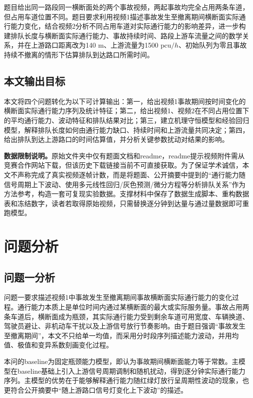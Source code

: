 \documentclass[UTF8,a4paper,12pt]{ctexart}
\newcommand{\pcu}{\mathrm{pcu}}
\begin{document}
题目给出同一路段同一横断面处的两个事故视频，两起事故均完全占用两条车道，但占用车道位置不同。题目要求利用视频1描述事故发生至撤离期间横断面实际通行能力变化，结合视频2分析不同占用车道对实际通行能力的影响差异，进一步构建排队长度与横断面实际通行能力、事故持续时间、路段上游车流量之间的数学关系，并在上游路口距离改为140 m、上游流量为1500 $\pcu/h$、初始队列为零且事故持续不撤离的情形下估算排队到达路口所需时间。

\subsection{本文输出目标}
本文将四个问题转化为以下可计算输出：第一，给出视频1事故期间按时间变化的横断面实际通行能力序列及统计特征；第二，给出视频1、视频2在不同占用位置下的平均通行能力、波动特征和排队结果对比；第三，建立机理守恒模型和经验回归模型，解释排队长度如何由通行能力缺口、持续时间和上游流量共同决定；第四，给出排队到达上游路口的时间估算值，并分析关键参数扰动对结果的影响。

\textbf{数据限制说明。}原始文件夹中仅有题面文档和readme，readme提示视频附件需从竞赛合作网站下载，但该历史下载链接当前不可直接获取。为了保证学术诚信，本文不声称完成了真实视频逐帧计数，而是将题面、公开摘要中提到的“通行能力随信号周期上下波动、使用多元线性回归/灰色预测/微分方程等分析排队关系”作为方法参考，构造一套可复现实验数据。支撑材料中保存了数据生成脚本、重构数据表和冻结数字，读者若取得原始视频，只需替换逐分钟到达量与通过量数据即可重跑模型。

\section{问题分析}
\subsection{问题一分析}
问题一要求描述视频1中事故发生至撤离期间事故横断面实际通行能力的变化过程。通行能力本质上是单位时间内通过某横断面的最大或实际服务量。事故占用两条车道后，横断面成为瓶颈，其实际通行能力受到剩余车道可用宽度、车辆换道、驾驶员避让、非机动车干扰以及上游信号放行节奏影响。由于题目强调“事故发生至撤离期间”，本文不只给单一均值，而采用分时段序列描述能力波动，并用均值、极值和变异系数刻画变化过程。

本问的baseline为固定瓶颈能力模型，即认为事故期间横断面能力等于常数。主模型在baseline基础上引入上游信号周期调制和随机扰动，得到逐分钟实际通行能力序列。主模型的优势在于能够解释通行能力随红绿灯放行呈周期性波动的现象，也更符合公开摘要中“随上游路口信号灯变化上下波动”的描述。
\end{document}
